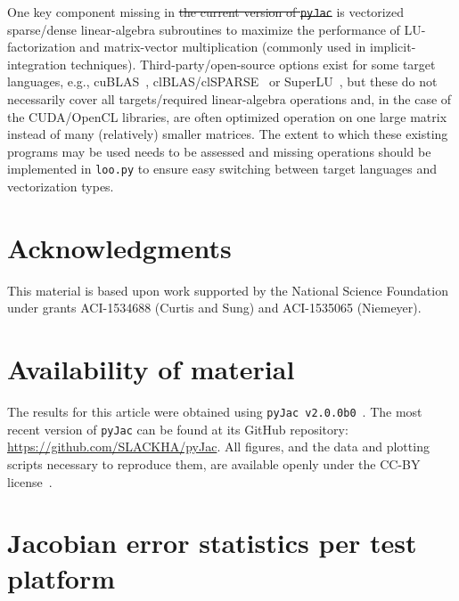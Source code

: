 \documentclass[12pt,number,sort&compress,preprint]{elsarticle}
\newcommand{\add}[1]{{\sloppy\cbcolor{OliveGreen}\textcolor{OliveGreen}{\cbstart {#1}\cbend}}\xspace}  %
\newcommand{\delete}[1]{\sloppy\cbcolor{RedOrange}\textcolor{RedOrange}{\cbdelete\sout{#1}}\xspace}
\newcommand{\add}[1]{#1\xspace}  %
\newcommand{\delete}[1]{\xspace} %
\begin{document}
One key component missing in \add{this work}\delete{ the current version of \texttt{pyJac}} is vectorized sparse\slash dense linear-algebra subroutines to maximize the performance of LU-factorization and matrix-vector multiplication (commonly used in implicit-integration techniques).
Third-party\slash open-source options exist for some target languages, e.g., cuBLAS~\cite{cublas}, clBLAS\slash clSPARSE~\cite{clmath} or SuperLU~\cite{superlu99}, but these do not necessarily cover all targets\slash required linear-algebra operations and, in the case of the CUDA\slash OpenCL libraries, are often optimized operation on one large matrix instead of many (relatively) smaller matrices.
The extent to which these existing programs may be used needs to be assessed and missing operations should be implemented in \texttt{loo.py} to ensure easy switching between target languages and vectorization types.

\section{Acknowledgments}
This material is based upon work supported by the National Science Foundation
under grants ACI-1534688 (Curtis and Sung) and ACI-1535065 (Niemeyer).

\pagebreak

\appendix
\setcounter{figure}{0}
\setcounter{table}{0}

\renewcommand*{\thesection}{\appendixname~\Alph{section}}

\section{Availability of material}
\label{A:availability}

The results for this article were obtained using \texttt{pyJac v2.0.0b0}~\cite{pyjac2}.
The most recent version of \texttt{pyJac} can be found at its GitHub repository:
\url{https://github.com/SLACKHA/pyJac}.
All figures, and the data and plotting scripts necessary to reproduce them,
are available openly under the CC-BY license~\cite{data}.

\section{Jacobian error statistics per test platform}
\label{A:per_platform}
\end{document}
